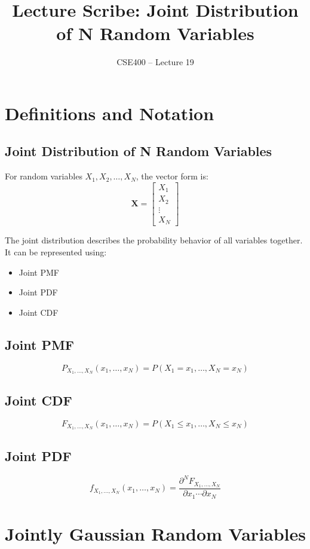 \documentclass[12pt]{article}
\title{Lecture Scribe: Joint Distribution of N Random Variables}
\author{CSE400 -- Lecture 19}
\date{}
\begin{document}
\maketitle

\section{Definitions and Notation}

\subsection{Joint Distribution of N Random Variables}
For random variables $X_1, X_2, \dots, X_N$, the vector form is:
\[
\mathbf{X} =
\begin{bmatrix}
X_1 \\
X_2 \\
\vdots \\
X_N
\end{bmatrix}
\]

The joint distribution describes the probability behavior of all variables together. It can be represented using:
\begin{itemize}
\item Joint PMF
\item Joint PDF
\item Joint CDF
\end{itemize}

\subsection{Joint PMF}
\[
P_{X_1, \dots, X_N}(x_1, \dots, x_N)
= P(X_1 = x_1, \dots, X_N = x_N)
\]

\subsection{Joint CDF}
\[
F_{X_1, \dots, X_N}(x_1, \dots, x_N)
= P(X_1 \le x_1, \dots, X_N \le x_N)
\]

\subsection{Joint PDF}
\[
f_{X_1, \dots, X_N}(x_1, \dots, x_N)
= \frac{\partial^N F_{X_1, \dots, X_N}}{\partial x_1 \cdots \partial x_N}
\]

\section{Jointly Gaussian Random Variables}
\end{document}
